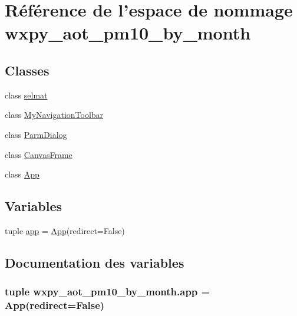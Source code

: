 \hypertarget{namespacewxpy__aot__pm10__by__month}{\section{Référence de l'espace de nommage wxpy\-\_\-aot\-\_\-pm10\-\_\-by\-\_\-month}
\label{namespacewxpy__aot__pm10__by__month}
}
\subsection*{Classes}
\begin{DoxyCompactItemize}
\item 
class \hyperlink{classwxpy__aot__pm10__by__month_1_1selmat}{selmat}
\item 
class \hyperlink{classwxpy__aot__pm10__by__month_1_1_my_navigation_toolbar}{My\-Navigation\-Toolbar}
\item 
class \hyperlink{classwxpy__aot__pm10__by__month_1_1_parm_dialog}{Parm\-Dialog}
\item 
class \hyperlink{classwxpy__aot__pm10__by__month_1_1_canvas_frame}{Canvas\-Frame}
\item 
class \hyperlink{classwxpy__aot__pm10__by__month_1_1_app}{App}
\end{DoxyCompactItemize}
\subsection*{Variables}
\begin{DoxyCompactItemize}
\item 
tuple \hyperlink{namespacewxpy__aot__pm10__by__month_a65e5a097e1930719563f1a64776f4b79}{app} = \hyperlink{classwxpy__aot__pm10__by__month_1_1_app}{App}(redirect=False)
\end{DoxyCompactItemize}


\subsection{Documentation des variables}
\hypertarget{namespacewxpy__aot__pm10__by__month_a65e5a097e1930719563f1a64776f4b79}{
\subsubsection[{app}]{\setlength{\rightskip}{0pt plus 5cm}tuple wxpy\-\_\-aot\-\_\-pm10\-\_\-by\-\_\-month.\-app = {\bf App}(redirect=False)}}\label{namespacewxpy__aot__pm10__by__month_a65e5a097e1930719563f1a64776f4b79}
